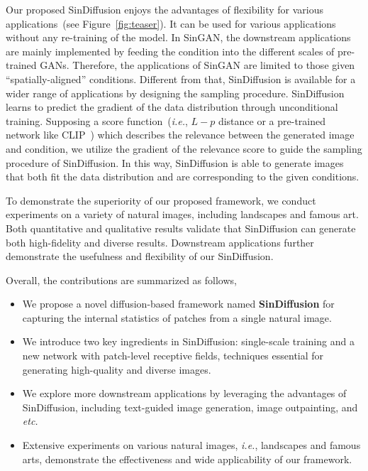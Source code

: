 \documentclass[10pt,twocolumn,letterpaper]{article}
\begin{document}
Our proposed SinDiffusion enjoys the advantages of flexibility for various applications~(see Figure~\ref{fig:teaser}). It can be used for various applications without any re-training of the model.
In SinGAN, the downstream applications are mainly implemented by feeding the condition into the different scales of pre-trained GANs.
Therefore, the applications of SinGAN are limited to those given ``spatially-aligned'' conditions.
Different from that, SinDiffusion is available for a wider range of applications by designing the sampling procedure.
SinDiffusion learns to predict the gradient of the data distribution through unconditional training.
Supposing a score function~(\emph{i.e.}, $L-p$ distance or a pre-trained network like CLIP~\cite{radford2021learning}) which describes the relevance between the generated image and condition, we utilize the gradient of the relevance score to guide the sampling procedure of SinDiffusion.
In this way, SinDiffusion is able to generate images that both fit the data distribution and are corresponding to the given conditions.

To demonstrate the superiority of our proposed framework, we conduct experiments on a variety of natural images, including landscapes and famous art.
Both quantitative and qualitative results validate that SinDiffusion can generate both high-fidelity and diverse results.
Downstream applications further demonstrate the usefulness and flexibility of our SinDiffusion.

Overall, the contributions are summarized as follows,
\begin{itemize}
    \item We propose a novel diffusion-based framework named \textbf{SinDiffusion} for capturing the internal statistics of patches from a single natural image.
    \vspace{-2mm} \item We introduce two key ingredients in SinDiffusion: single-scale training and a new network with patch-level receptive fields, techniques essential for generating high-quality and diverse images.
    \vspace{-2mm} \item We explore more downstream applications by leveraging the advantages of SinDiffusion, including text-guided image generation, image outpainting, and \emph{etc.}
    \vspace{-6.1mm} \item Extensive experiments on various natural images, \emph{i.e.}, landscapes and famous arts, demonstrate the effectiveness and wide applicability of our framework.
\end{itemize}
\end{document}
